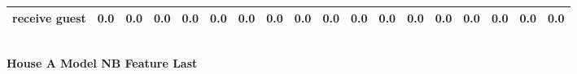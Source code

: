 \documentclass{article}
\begin{document}
\begin{sideways}
\begin{tabular}{lrrrrrrrrrrrrrrrrr}
receive guest                 &         0.0 &                0.0 &           0.0 &               0.0 &                0.0 &                0.0 &              0.0 &                      0.0 &                   0.0 &              0.0 &              0.0 &                            0.0 &                      0.0 &                    0.0 &                                  0.0 &                          0.0 &                  0.0 \\
\bottomrule
\end{tabular}
\end{sideways}
\normalsize
\vspace{1cm}\\
\textbf{House A Model NB Feature Last}\\
\vspace{1cm}\\
\end{document}
